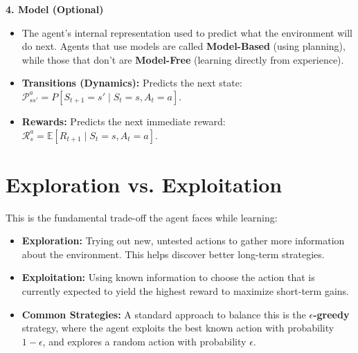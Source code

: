 \textbf{\textcolor{primary}{4. Model (Optional)}}
\begin{itemize}
    \item The agent's internal representation used to predict what the environment will do next. Agents that use models are called \textbf{Model-Based} (using planning), while those that don't are \textbf{Model-Free} (learning directly from experience).
    \item \textbf{Transitions (Dynamics):} Predicts the next state: $\mathcal{P}_{ss'}^a = P[S_{t+1}=s' \mid S_t=s, A_t=a]$.
    \item \textbf{Rewards:} Predicts the next immediate reward: $\mathcal{R}_s^a = \mathbb{E}[R_{t+1} \mid S_t=s, A_t=a]$.
\end{itemize}

\section{\textcolor{secondary}{Exploration vs. Exploitation}}
This is the fundamental trade-off the agent faces while learning:
\begin{itemize}
    \item \textbf{Exploration:} Trying out new, untested actions to gather more information about the environment. This helps discover better long-term strategies.
    \item \textbf{Exploitation:} Using known information to choose the action that is currently expected to yield the highest reward to maximize short-term gains.
    \item \textbf{Common Strategies:} A standard approach to balance this is the \textbf{$\epsilon$-greedy} strategy, where the agent exploits the best known action with probability $1-\epsilon$, and explores a random action with probability $\epsilon$.
\end{itemize}